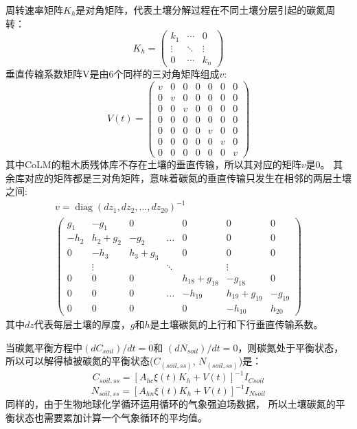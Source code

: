 周转速率矩阵$K_h$是对角矩阵，代表土壤分解过程在不同土壤分层引起的碳氮周转：
\begin{equation}
K_{h}=\left(\begin{array}{ccc}k_{1} & \cdots & 0 \\ \vdots & \ddots & \vdots \\ 0 & \cdots & k_{n}\end{array}\right)
\end{equation}
垂直传输系数矩阵V是由6个同样的三对角矩阵组成$v$:
\begin{equation}
V(t)=\left(\begin{array}{ccccccc}v & 0 & 0 & 0 & 0 & 0 & 0 \\ 0 & v & 0 & 0 & 0 & 0 & 0 \\ 0 & 0 & v & 0 & 0 & 0 & 0 \\ 0 & 0 & 0 & 0 & 0 & 0 & 0 \\ 0 & 0 & 0 & 0 & v & 0 & 0 \\ 0 & 0 & 0 & 0 & 0 & v & 0 \\ 0 & 0 & 0 & 0 & 0 & 0 & v\end{array}\right)
\end{equation}
其中CoLM的粗木质残体库不存在土壤的垂直传输，所以其对应的矩阵$v$是0。
其余库对应的矩阵都是三对角矩阵，意味着碳氮的垂直传输只发生在相邻的两层土壤之间:
\begin{equation}
\begin{array}{c}v=\operatorname{diag}\left(d z_{1}, d z_{2}, \ldots,  d z_{20}\right)^{-1} \\ 
  \left(\begin{array}{ccccccc}g_{1} & -g_{1} & 0 & & 0 & 0 & 0 \\
     -h_{2} & h_{2}+g_{2} & -g_{2} & \ldots & 0 & 0 & 0 \\ 0 & -h_{3} & h_{3}+g_{3} & & 0 & 0 & 0 \\
      & \vdots & & \ddots & & \vdots & \\ 0 & 0 & 0 & & h_{18}+g_{18} & -g_{18} & 0 \\
     0 & 0 & 0 & \ldots & -h_{19} & h_{19}+g_{19} & -g_{19} \\ 0 & 0 & 0 & & 0 & -h_{10} & h_{20}\end{array}\right)\end{array}
\end{equation}
其中$dz$代表每层土壤的厚度，$g$和$h$是土壤碳氮的上行和下行垂直传输系数。

当碳氮平衡方程中$(dC_{soil})/dt=0$和 $(dN_{soil})/dt=0$，则碳氮处于平衡状态，
所以可以解得植被碳氮的平衡状态($C_{(soil,ss)}$, $N_{(soil,ss)}$)是：
%
\begin{equation}
C_{soil, s s}=\left[A_{h c} \xi(t) K_{h}+V(t)\right]^{-1} I_{C s o i l}
\end{equation}
\begin{equation}
N_{soil, s s}=\left[A_{h n} \xi(t) K_{h}+V(t)\right]^{-1} I_{N s o i l}
\end{equation}
同样的，由于生物地球化学循环运用循环的气象强迫场数据，
所以土壤碳氮的平衡状态也需要累加计算一个气象循环的平均值。 










